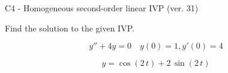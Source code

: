\begin{exercise}
  \begin{exerciseTitle}C4 - Homogeneous second-order linear IVP (ver. 31)\end{exerciseTitle}
  \begin{exerciseStatement}
    
Find the solution to the given IVP.

    
\[y''+4y = 0 \hspace{1em} y(0) = 1 , y'(0) = 4\]

  \end{exerciseStatement}
  \begin{exerciseAnswer}
    
\[y= \cos\left(2 \, t\right) + 2 \, \sin\left(2 \, t\right)\]

  \end{exerciseAnswer}
\end{exercise}